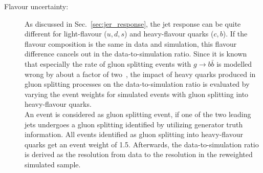 \begin{description}
\item[Flavour uncertainty:] As discussed in Sec.~\ref{sec:jer_response}, the jet response can be quite different for light-flavour ($u,d,s$) and heavy-flavour quarks ($c,b$). If the flavour composition is the same in data and simulation, this flavour difference cancels out in the data-to-simulation ratio. Since it is known that especially the rate of gluon splitting events with $g \rightarrow b\bar{b}$ is modelled wrong by about a factor of two~\cite{Khachatryan:2011wq}, the impact of heavy quarks produced in gluon splitting processes on the data-to-simulation ratio is evaluated by varying the event weights for simulated events with gluon splitting into heavy-flavour quarks.\\
An event is considered as gluon splitting event, if one of the two leading jets undergoes a gluon splitting identified by utilizing generator truth information. All events identified as gluon splitting into heavy-flavour quarks get an event weight of 1.5. Afterwards, the data-to-simulation ratio is derived as the resolution from data to the resolution in the reweighted simulated sample. 


\end{description}
